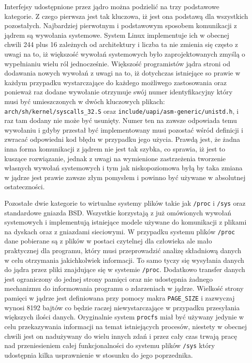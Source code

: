 \documentclass[10pt]{scrartcl}
\begin{document}
Interfejsy udostępnione przez jądro można podzielić na trzy podstawowe kategorie. Z czego pierwsza jest tak kluczowa, iż jest ona podstawą dla wszystkich pozostałych. Najbardziej pierwotnym i podstawowym sposobem komunikacji z jądrem są wywołania systemowe. System Linux implementuje ich w obecnej chwili 244 plus 16 zależnych od architektury i liczba ta nie zmienia się często z uwagi na to, iż większość wywołań systemowych było zaprojektowanych zmyślą o wypełnianiu wielu ról jednocześnie.  Większość programistów jądra stroni od dodawania nowych wywołań z uwagi na to, iż dotychczas istniejące so prawie w każdym przypadku wystarczające do każdego możliwego zastosowania oraz ponieważ raz dodane wywołanie otrzymuje swój numer identyfikacyjny który musi być umieszczonych w dwóch kluczowych plikach: \texttt{arch/sh/kernel/syscalls\_32.S} oraz \texttt{include/uapi/asm-generic/unistd.h}, i raz tam dodany nie może być usunięty. Numer ten na zawsze odpowiada temu wywołaniu i gdyby przestał być implementowany musi pozostać wśród definicji i zwracać odpowiedni kod błędu w przypadku jego użycia. Prawdą jest, że żadna inna forma komunikacji z jądrem nie jest tak szybka, co sprawia, iż jest to kuszące rozwiązanie, jednak z uwagi na wymienione zastrzeżenia tworzenie własnych wywołań systemowych i tym jak niskopoziomowa byłą by taka zmiana w jądrze jest prawie zawsze złym pomysłem i powinno być używane w absolutnej ostateczności.

Pozostałe dwie kategorie to wirtualne systemy plików takie jak \texttt{/proc} i \texttt{/sys} oraz standardowe gniazda BSD\@. Wszystkie korzystają z już omówionych wywołań systemowych i implementują istniejące modele używane do komunikacji z plikami na dyskach oraz z gniazdami sieciowymi. W przypadku systemu plików \texttt{/proc} dane pobierane są z plików w postaci czytelnej dla człowieka ale mało praktycznej dla programu, który musi przeprowadzić analizę składniową danych w celu otrzymania jakichkolwiek informacji. To samo tyczy się wysyłania danych do jądra przez pliki znajdujące się w systemie \texttt{/proc}. Dodatkowo transfer danych jest ograniczony do jednej strony pamięci oraz nie udostępnia żadnego mechanizmu do informowania programu o zdarzeniach w jądrze. Wielkość strony pamięci w jądrze jest definiowana przy pomocy makra \texttt{PAGE\_SIZE} i zazwyczaj wynosi 8192 bajtów co będzie raczej niewystarczające w przypadku przesyłania większych ilości danych. Oryginalnie system \texttt{procfs} miał być używany jedynie w celu przekazywania informacji na temat istniejących procesów, niestety w obecnej chwili jest on nadużywany do wielu innych zdań i przez cały czas trwają pracę nad przeniesieniem całej funkcjonalności do systemu plików \texttt{/sys} który udostępnia kilka usprawnienie w stosunku do jego poprzednika.
\end{document}

